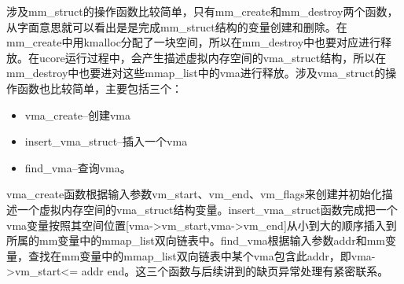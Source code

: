 涉及mm\_struct的操作函数比较简单，只有mm\_create和mm\_destroy两个函数，从字面意思就可以看出是是完成mm\_struct结构的变量创建和删除。在mm\_create中用kmalloc分配了一块空间，所以在mm\_destroy中也要对应进行释放。在ucore运行过程中，会产生描述虚拟内存空间的vma\_struct结构，所以在mm\_destroy中也要进对这些mmap\_list中的vma进行释放。涉及vma\_struct的操作函数也比较简单，主要包括三个：

\begin{itemize}
\tightlist
\item
  vma\_create--创建vma
\item
  insert\_vma\_struct--插入一个vma
\item
  find\_vma--查询vma。
\end{itemize}

vma\_create函数根据输入参数vm\_start、vm\_end、vm\_flags来创建并初始化描述一个虚拟内存空间的vma\_struct结构变量。insert\_vma\_struct函数完成把一个vma变量按照其空间位置{[}vma-\textgreater{}vm\_start,vma-\textgreater{}vm\_end{]}从小到大的顺序插入到所属的mm变量中的mmap\_list双向链表中。find\_vma根据输入参数addr和mm变量，查找在mm变量中的mmap\_list双向链表中某个vma包含此addr，即vma-\textgreater{}vm\_start\textless{}=
addr end。这三个函数与后续讲到的缺页异常处理有紧密联系。
